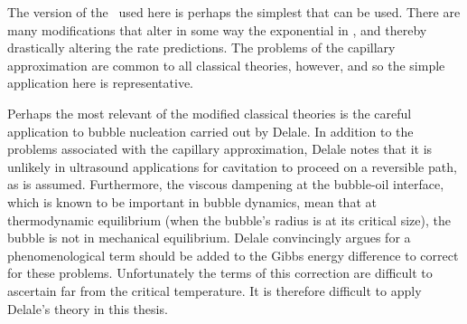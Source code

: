 


The version of the \cnt\ used here is perhaps the simplest that can be used.
There are many modifications that alter in some way the exponential in ,
and thereby drastically altering the rate predictions.
The problems of the capillary approximation are common to all classical theories, however, 
and so the simple application here is representative.

Perhaps the most relevant of the modified classical theories is the careful application to bubble nucleation carried out by Delale\cite{Delale2003}.
In addition to the problems associated with the capillary approximation,
Delale notes that it is unlikely in ultrasound applications for cavitation to proceed on a reversible path, as is assumed.
Furthermore, the viscous dampening at the bubble-oil interface, which is known to be important in bubble dynamics, mean that 
at thermodynamic equilibrium (when the bubble's radius is at its critical size),
the bubble is not in mechanical equilibrium.
Delale\cite{Delale2003}  convincingly argues for a phenomenological term should be added to the Gibbs energy difference to correct for these problems.
Unfortunately the terms of this correction are difficult to ascertain far from the critical temperature.
It is therefore difficult to apply Delale's theory in this thesis\cite{Delale2003}.




